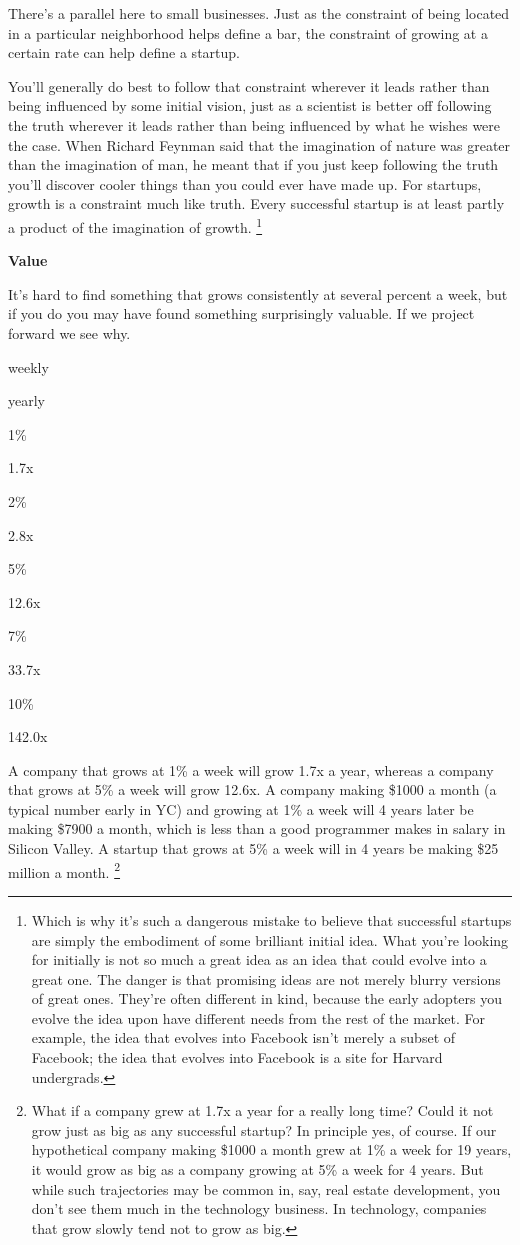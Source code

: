 There's a parallel here to small businesses. Just as the constraint of
being located in a particular neighborhood helps define a bar, the
constraint of growing at a certain rate can help define a startup.

You'll generally do best to follow that constraint wherever it leads
rather than being influenced by some initial vision, just as a scientist
is better off following the truth wherever it leads rather than being
influenced by what he wishes were the case. When Richard Feynman said
that the imagination of nature was greater than the imagination of man,
he meant that if you just keep following the truth you'll discover
cooler things than you could ever have made up. For startups, growth is
a constraint much like truth. Every successful startup is at least
partly a product of the imagination of growth. \footnote{Which is why it's such a dangerous mistake to believe that
successful startups are simply the embodiment of some brilliant initial
idea. What you're looking for initially is not so much a great idea as
an idea that could evolve into a great one. The danger is that promising
ideas are not merely blurry versions of great ones. They're often
different in kind, because the early adopters you evolve the idea upon
have different needs from the rest of the market. For example, the idea
that evolves into Facebook isn't merely a subset of Facebook; the idea
that evolves into Facebook is a site for Harvard undergrads.}

\textbf{Value}

It's hard to find something that grows consistently at several percent a
week, but if you do you may have found something surprisingly valuable.
If we project forward we see why.

weekly

yearly

1\%

1.7x

2\%

2.8x

5\%

12.6x

7\%

33.7x

10\%

142.0x

A company that grows at 1\% a week will grow 1.7x a year, whereas a
company that grows at 5\% a week will grow 12.6x. A company making
\$1000 a month (a typical number early in YC) and growing at 1\% a week
will 4 years later be making \$7900 a month, which is less than a good
programmer makes in salary in Silicon Valley. A startup that grows at
5\% a week will in 4 years be making \$25 million a month.
\footnote{What if a company grew at 1.7x a year for a really long time?
Could it not grow just as big as any successful startup? In principle
yes, of course. If our hypothetical company making \$1000 a month grew
at 1\% a week for 19 years, it would grow as big as a company growing at
5\% a week for 4 years. But while such trajectories may be common in,
say, real estate development, you don't see them much in the technology
business. In technology, companies that grow slowly tend not to grow as
big.}

